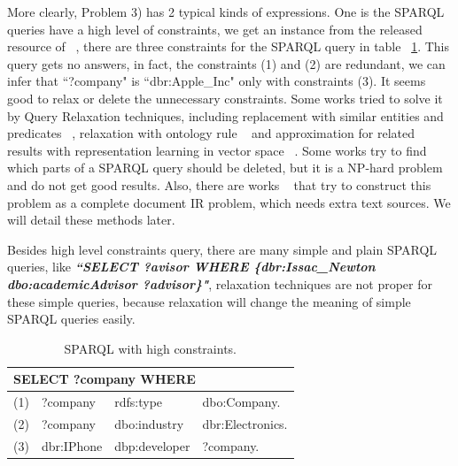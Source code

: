 \documentclass[runningheads]{llncs}
\begin{document}
More clearly, Problem 3) has 2 typical kinds of expressions.
One is the SPARQL queries have a high level of constraints, we get an instance from the released resource of ~\cite{wangEmbed}, there are three constraints for the SPARQL query in table ~\ref{S_Example}. This query gets no answers, in fact, the constraints (1) and (2) are redundant, we can infer that ``?company" is ``dbr:Apple\_Inc" only with constraints (3). It seems good to relax or delete the unnecessary constraints. Some works tried to solve it by Query Relaxation techniques, including replacement with similar entities and predicates ~\cite{elbassuoni2011query}, relaxation with ontology rule ~\cite{2010combining} and approximation for related results with representation learning in vector space ~\cite{wangEmbed, hamilton2018embedding, zhang2018trquery}. Some works try to find which parts of a SPARQL query should be deleted, but it is a NP-hard problem and do not get good results. Also, there are works ~\cite{huang2012} that try to construct this problem as a complete document IR problem, which needs extra text sources. We will detail these methods later.

Besides high level constraints query, there are many simple and plain SPARQL queries, like \textbf{\textit{``SELECT ?avisor WHERE \{dbr:Issac\_Newton dbo:academicAdvisor ?advisor\}"}}, relaxation techniques are not proper for these simple queries, because relaxation will change the meaning of simple SPARQL queries easily.

\begin{table}
\caption{SPARQL with high constraints.}\label{S_Example}
\centering
\begin{tabular}{|c|lll|}
\hline
\multicolumn{4}{|l|}{SELECT ?company WHERE }\\
\hline
(1) &  ?company & rdfs:type & dbo:Company.\\
(2) &  ?company  & dbo:industry  & dbr:Electronics.\\
(3) & dbr:IPhone & dbp:developer & ?company.\\
\hline
\end{tabular}
\end{table}
\end{document}
